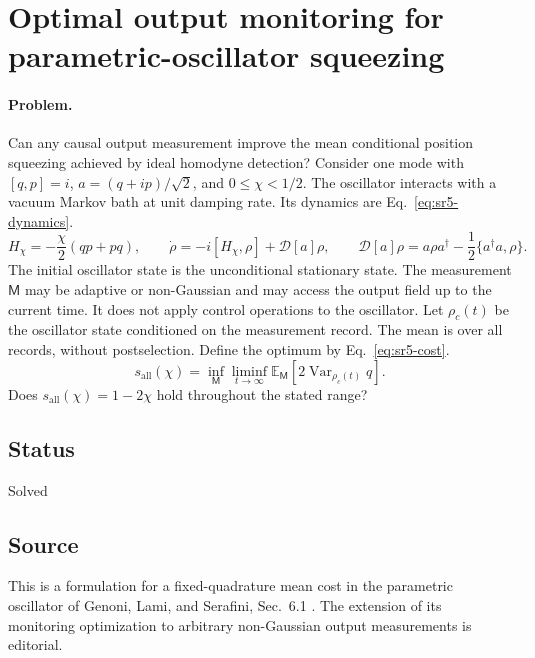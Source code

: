 \section{Optimal output monitoring for parametric-oscillator squeezing}
\label{sec:op_b52e28b95f7677a7}

\paragraph{Problem.}
Can any causal output measurement improve the mean conditional position squeezing achieved by ideal homodyne detection?
Consider one mode with $[q,p]=i$, $a=(q+ip)/\sqrt2$, and $0\leq\chi<1/2$.
The oscillator interacts with a vacuum Markov bath at unit damping rate.
Its dynamics are Eq.~\eqref{eq:sr5-dynamics}.
\begin{equation}
H_\chi=-\frac\chi2(qp+pq),\qquad
\dot\rho=-i[H_\chi,\rho]+\mathcal D[a]\rho,\qquad
\mathcal D[a]\rho=a\rho a^\dagger-\frac12\{a^\dagger a,\rho\}.
\label{eq:sr5-dynamics}
\end{equation}
The initial oscillator state is the unconditional stationary state.
The measurement $\mathsf M$ may be adaptive or non-Gaussian and may access the output field up to the current time.
It does not apply control operations to the oscillator.
Let $\rho_c(t)$ be the oscillator state conditioned on the measurement record.
The mean is over all records, without postselection.
Define the optimum by Eq.~\eqref{eq:sr5-cost}.
\begin{equation}
s_{\mathrm{all}}(\chi)=\inf_{\mathsf M}\liminf_{t\to\infty}\mathbb E_{\mathsf M}\!\left[2\operatorname{Var}_{\rho_c(t)}q\right].
\label{eq:sr5-cost}
\end{equation}
Does $s_{\mathrm{all}}(\chi)=1-2\chi$ hold throughout the stated range?

\subsection*{Status}

Solved

\subsection*{Source}

This is a formulation for a fixed-quadrature mean cost in the parametric oscillator of Genoni, Lami, and Serafini, Sec.~6.1 . The extension of its monitoring optimization to arbitrary non-Gaussian output measurements is editorial.

